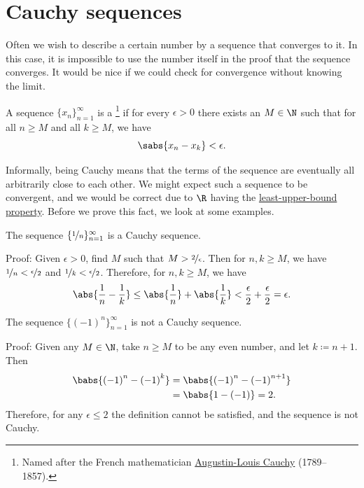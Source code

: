 \section{Cauchy sequences}
\label{sec:cauchy}


Often we wish to describe a certain number 
by a sequence that converges to it.  In this case, it is impossible to use the
number itself in the proof that the sequence converges.
It would be nice if we could check for convergence without knowing
the limit.

\begin{defn}
A sequence $\{ x_n \}_{n=1}^\infty$ is a \emph{}%
\footnote{%
Named after the French mathematician
\href{https://en.wikipedia.org/wiki/Cauchy}{Augustin-Louis Cauchy} (1789--1857).} if
for every $\epsilon > 0$ there exists an $M \in \N$ such that
for all $n \geq M$ and all $k \geq M$, we have
\begin{equation*}
\sabs{x_n - x_k} < \epsilon .
\end{equation*}
\end{defn}

Informally, being Cauchy means that the terms of the sequence are eventually
all arbitrarily close to each other.  We might expect such a sequence to be
convergent, and we would be correct due to $\R$ having the
\hyperref[defn:lub]{least-upper-bound property}.  Before we prove this fact,
we look at some examples.

\begin{example}
The sequence $\{ \nicefrac{1}{n} \}_{n=1}^\infty$ is a Cauchy sequence.

Proof:  Given $\epsilon > 0$, find $M$ such that
$M > \nicefrac{2}{\epsilon}$.  Then for $n,k \geq M$,
we have $\nicefrac{1}{n} < \nicefrac{\epsilon}{2}$
and
$\nicefrac{1}{k} < \nicefrac{\epsilon}{2}$.  Therefore, for $n, k \geq M$,
we have
\begin{equation*}
\abs{\frac{1}{n} - \frac{1}{k}}
\leq
\abs{\frac{1}{n}} + \abs{\frac{1}{k}}
< \frac{\epsilon}{2} + \frac{\epsilon}{2} = \epsilon.
\end{equation*}
\end{example}

\begin{example}
The sequence $\bigl\{ {(-1)}^n \bigr\}_{n=1}^\infty$ is not a Cauchy sequence.

Proof:
Given any $M \in \N$, take $n \geq M$ to be any even number, and
let $k \coloneqq n+1$.  Then
\begin{equation*}
\begin{split}
\babs{{(-1)}^n - {(-1)}^k}
& =
\babs{{(-1)}^n - {(-1)}^{n+1}}
\\
& =
\babs{1 - (-1)} = 2 .
\end{split}
\end{equation*}
Therefore, for any $\epsilon \leq 2$ the definition cannot be satisfied, and
the sequence is not Cauchy.
\end{example}

